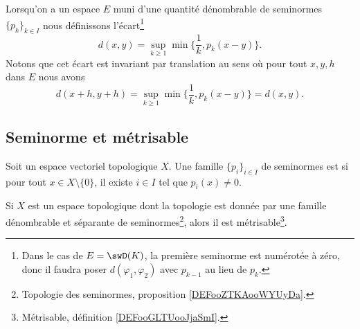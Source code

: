 Lorsqu'on a un espace \( E\) muni d'une quantité dénombrable de seminormes \( \{ p_k \}_{k\in I}\) nous définissons l'écart\footnote{Dans le cas de \( E=\swD(K)\), la première seminorme est numérotée à zéro, donc il faudra poser \( d(\varphi_1,\varphi_2)\) avec \( p_{k-1}\) au lieu de \( p_k\).}
\begin{equation}        \label{EqAAghiUR}
	d(x,y)=\sup_{k\geq 1}\min\big\{  \frac{1}{ k },p_k(x-y) \big\}.
\end{equation}
Notons que cet écart est invariant par translation au sens où pour tout \( x,y,h\) dans \( E\) nous avons
\begin{equation}
	d(x+h,y+h)=\sup_{k\geq 1}\min\big\{ \frac{1}{ k },p_k(x-y) \big\}=d(x,y).
\end{equation}

\subsection{Seminorme et métrisable}

\begin{definition}
	Soit un espace vectoriel topologique \( X\). Une famille \( \{ p_i \}_{i\in I}\) de seminormes est  si pour tout \( x\in X\setminus\{ 0 \}\), il existe \( i\in I\) tel que \( p_i(x)\neq 0\).
\end{definition}

\begin{proposition}     \label{PROPooMJEQooHtIyeX}
	Si \( X\) est un espace topologique dont la topologie est donnée par une famille dénombrable et séparante de seminormes\footnote{Topologie des seminormes, proposition \ref{DEFooZTKAooWYUyDa}.}, alors il est métrisable\footnote{Métrisable, définition \ref{DEFooGLTUooJjaSmI}.}.
\end{proposition}

